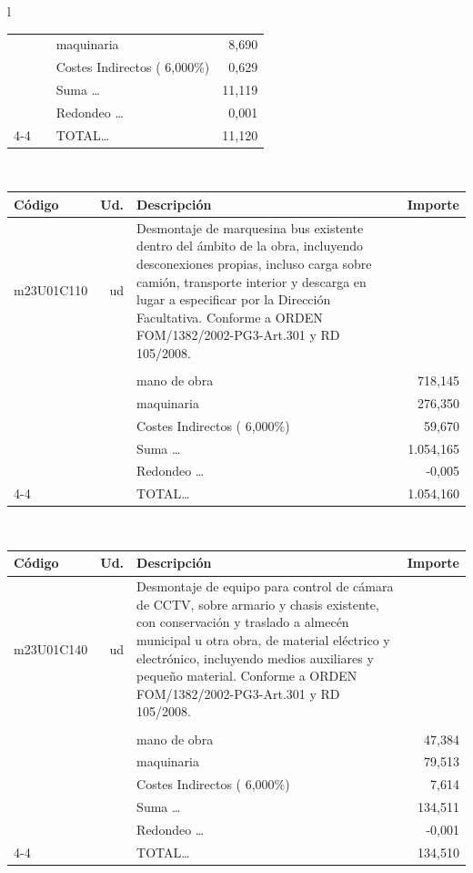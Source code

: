 \documentclass{book}%
\begin{document}
\begin{longtable}{l}
\begin{tabular}{l r p{60mm} r}
&&maquinaria&     8,690\\%
&&Costes Indirectos (     6,000\%)&     0,629\\%
&&Suma \ldots&    11,119\\%
&&Redondeo \ldots&     0,001\\%
\cline{4-4}%
&&TOTAL\ldots&    11,120\\%
\end{tabular}\\%
\begin{tabular}{l r p{60mm} r}%
Código&Ud.&Descripción&Importe\\%
\hline%
m23U01C110&ud&Desmontaje de marquesina bus existente dentro del ámbito de la obra, incluyendo desconexiones propias, incluso carga sobre camión, transporte interior y descarga en lugar a especificar por la Dirección Facultativa. Conforme a ORDEN FOM/1382/2002{-}PG3{-}Art.301 y RD 105/2008.&\\%
&&&\\%
&&mano de obra&   718,145\\%
&&maquinaria&   276,350\\%
&&Costes Indirectos (     6,000\%)&    59,670\\%
&&Suma \ldots& 1.054,165\\%
&&Redondeo \ldots&    {-}0,005\\%
\cline{4-4}%
&&TOTAL\ldots& 1.054,160\\%
\end{tabular}\\%
\begin{tabular}{l r p{60mm} r}%
Código&Ud.&Descripción&Importe\\%
\hline%
m23U01C140&ud&Desmontaje de equipo para control de cámara de CCTV, sobre armario y chasis existente, con conservación y traslado a almecén municipal u otra obra, de material eléctrico y electrónico, incluyendo medios auxiliares y pequeño material. Conforme a ORDEN FOM/1382/2002{-}PG3{-}Art.301 y RD 105/2008.&\\%
&&&\\%
&&mano de obra&    47,384\\%
&&maquinaria&    79,513\\%
&&Costes Indirectos (     6,000\%)&     7,614\\%
&&Suma \ldots&   134,511\\%
&&Redondeo \ldots&    {-}0,001\\%
\cline{4-4}%
&&TOTAL\ldots&   134,510\\%
\end{tabular}\\%

\end{longtable}
\end{document}
